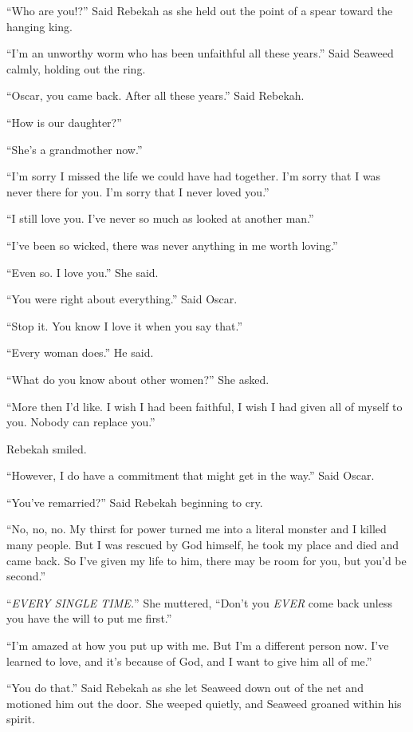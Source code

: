 ``Who are you!?'' Said Rebekah as she held out the point of a spear toward the hanging king.

``I'm an unworthy worm who has been unfaithful all these years.'' Said Seaweed calmly, holding out the ring.

``Oscar, you came back. After all these years.'' Said Rebekah.

``How is our daughter?''

``She's a grandmother now.''

``I'm sorry I missed the life we could have had together. I'm sorry that I was never there for you. I'm sorry that I never loved you.''

``I still love you. I've never so much as looked at another man.''

``I've been so wicked, there was never anything in me worth loving.''

``Even so. I love you.'' She said.

``You were right about everything.'' Said Oscar.

``Stop it. You know I love it when you say that.''

``Every woman does.'' He said.

``What do you know about other women?'' She asked.

``More then I'd like. I wish I had been faithful, I wish I had given all of myself to you. Nobody can replace you.''

Rebekah smiled.

``However, I do have a commitment that might get in the way.'' Said Oscar.

``You've remarried?'' Said Rebekah beginning to cry.

``No, no, no. My thirst for power turned me into a literal monster and I killed many people. But I was rescued by God himself, he took my place and died and came back. So I've given my life to him, there may be room for you, but you'd be second.''

``\emph{EVERY SINGLE TIME.}'' She muttered, ``Don't you \emph{EVER} come back unless you have the will to put me first.''

``I'm amazed at how you put up with me. But I'm a different person now. I've learned to love, and it's because of God, and I want to give him all of me.''

``You do that.'' Said Rebekah as she let Seaweed down out of the net and motioned him out the door. She weeped quietly, and Seaweed groaned within his spirit.

